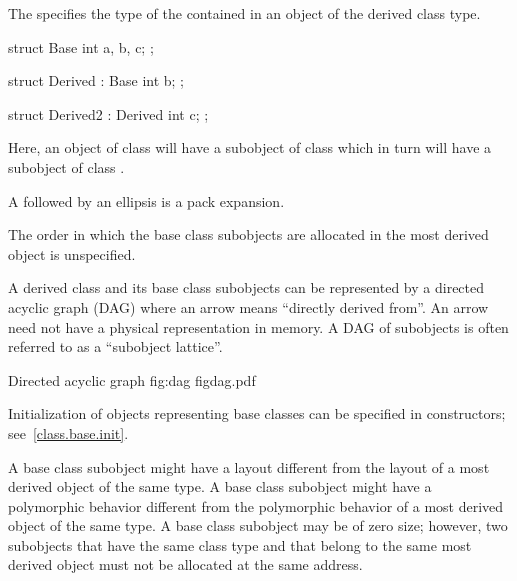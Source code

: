 \pnum
The  specifies the type of the
 contained in an
object of the derived class type.
\begin{example}
\begin{codeblock}
struct Base {
  int a, b, c;
};
\end{codeblock}

\begin{codeblock}
struct Derived : Base {
  int b;
};
\end{codeblock}

\begin{codeblock}
struct Derived2 : Derived {
  int c;
};
\end{codeblock}

Here, an object of class  will have a subobject of class
 which in turn will have a subobject of class
.
\end{example}

\pnum
A  followed by an ellipsis is a pack
expansion.

\pnum
The order in which the base class subobjects are allocated in the most
derived object is unspecified.
\begin{note}
%
%
A derived class and its base class subobjects can be represented by a
directed acyclic graph (DAG) where an arrow means ``directly derived
from''. An arrow need not have a physical representation in memory.
A DAG of subobjects is often referred to as a ``subobject lattice''.

\begin{importgraphic}
{Directed acyclic graph}
{fig:dag}
{figdag.pdf}
\end{importgraphic}
\end{note}

\pnum
\begin{note}
Initialization of objects representing base classes can be specified in
constructors; see~\ref{class.base.init}.
\end{note}

\pnum
\begin{note}
A base class subobject might have a layout different
from the layout of a most derived object of the same type. A base class
subobject might have a polymorphic behavior
different from the polymorphic behavior of a most derived object of the
same type. A base class subobject may be of zero size;
however, two subobjects that have the same class type and that belong to
the same most derived object must not be allocated at the same
address.
\end{note}

